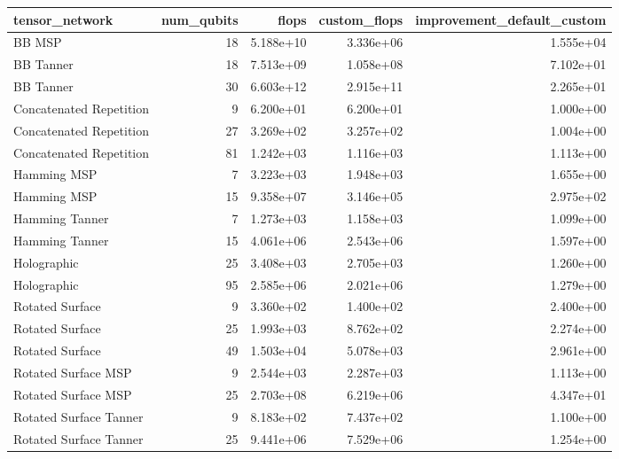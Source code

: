 \begin{tabular}{lrrrr}
\toprule
tensor_network & num_qubits & flops & custom_flops & improvement_default_custom \\
\midrule
BB MSP & 18 & 5.188e+10 & 3.336e+06 & 1.555e+04 \\
BB Tanner & 18 & 7.513e+09 & 1.058e+08 & 7.102e+01 \\
BB Tanner & 30 & 6.603e+12 & 2.915e+11 & 2.265e+01 \\
Concatenated Repetition & 9 & 6.200e+01 & 6.200e+01 & 1.000e+00 \\
Concatenated Repetition & 27 & 3.269e+02 & 3.257e+02 & 1.004e+00 \\
Concatenated Repetition & 81 & 1.242e+03 & 1.116e+03 & 1.113e+00 \\
Hamming MSP & 7 & 3.223e+03 & 1.948e+03 & 1.655e+00 \\
Hamming MSP & 15 & 9.358e+07 & 3.146e+05 & 2.975e+02 \\
Hamming Tanner & 7 & 1.273e+03 & 1.158e+03 & 1.099e+00 \\
Hamming Tanner & 15 & 4.061e+06 & 2.543e+06 & 1.597e+00 \\
Holographic & 25 & 3.408e+03 & 2.705e+03 & 1.260e+00 \\
Holographic & 95 & 2.585e+06 & 2.021e+06 & 1.279e+00 \\
Rotated Surface & 9 & 3.360e+02 & 1.400e+02 & 2.400e+00 \\
Rotated Surface & 25 & 1.993e+03 & 8.762e+02 & 2.274e+00 \\
Rotated Surface & 49 & 1.503e+04 & 5.078e+03 & 2.961e+00 \\
Rotated Surface MSP & 9 & 2.544e+03 & 2.287e+03 & 1.113e+00 \\
Rotated Surface MSP & 25 & 2.703e+08 & 6.219e+06 & 4.347e+01 \\
Rotated Surface Tanner & 9 & 8.183e+02 & 7.437e+02 & 1.100e+00 \\
Rotated Surface Tanner & 25 & 9.441e+06 & 7.529e+06 & 1.254e+00 \\
\bottomrule
\end{tabular}
